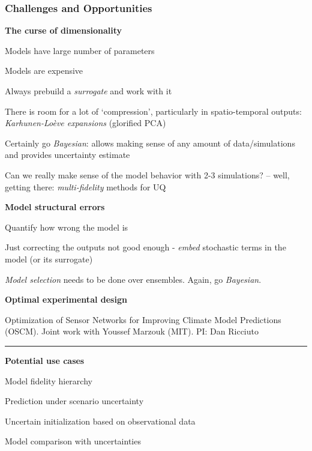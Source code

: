 \begin{frame}[t]
\label{closure}
\frametitle{Challenges and Opportunities}

\vspace*{-0.4cm}
\scriptsize{

\bi
\item[] \textbf{The curse of dimensionality}
\bi
\tiny{
\item Models have large number of parameters
\item Models are expensive
\medskip
\item Always prebuild a \emph{surrogate} and work with it
\item There is room for a lot of `compression', particularly in spatio-temporal outputs: \emph{Karhunen-Lo\`{e}ve expansions} (glorified PCA)
\item Certainly go \emph{Bayesian}: allows making sense of any amount of data/simulations and provides uncertainty estimate
\item Can we really make sense of the model behavior with 2-3 simulations? -- well, getting there: \emph{multi-fidelity} methods for UQ
}
\ei
\item[] \textbf{Model structural errors}
\bi
\tiny{
\item Quantify how wrong the model is
\item Just correcting the outputs not good enough - \emph{embed} stochastic terms in the model (or its surrogate)
\item \emph{Model selection} needs to be done over ensembles. Again, go \emph{Bayesian}.
}
\ei
\item[] \textbf{Optimal experimental design}
\bi
\tiny{
\item Optimization of Sensor Networks for Improving Climate Model Predictions (OSCM). Joint work with Youssef Marzouk (MIT). PI: Dan Ricciuto
}
\ei
\ei
\hrule
\bi
\item[] \textbf{Potential use cases}
\medskip
\bi
\scriptsize{
\item Model fidelity hierarchy
\item Prediction under scenario uncertainty
\item Uncertain initialization based on observational data
\item Model comparison with uncertainties
}
\ei
\ei

}


\end{frame}
